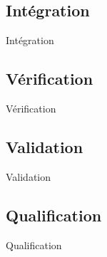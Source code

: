 \AntoineSpeak
\subsection{Intégration}
\begin{frame}{Intégration}
	
\end{frame}

\ZacSpeak
\subsection{Vérification}
\begin{frame}{Vérification}
	
	
\end{frame}

\SteveSpeak
\subsection{Validation}
\begin{frame}{Validation}
	
\end{frame}
\subsection{Qualification}
\begin{frame}{Qualification}
	
\end{frame}
